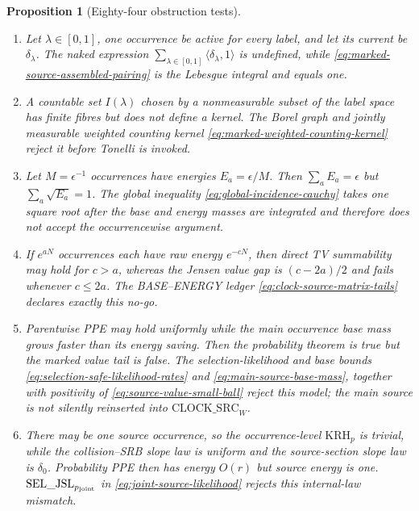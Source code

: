 \documentclass[11pt]{article}
\newtheorem{proposition}[theorem]{Proposition}
\begin{document}
\begin{proposition}[Eighty-four obstruction tests]
\begin{enumerate}[label=\textup{(T\arabic*)}]
      from a probability first-hit partition.  The canonical owner map in
      Definition~\ref{def:source-incidence-space} identifies physical
      occurrences, not event supports, and therefore retains both.
\item Let $\lambda\in[0,1]$, one occurrence be active for every label, and
      let its current be $\delta_\lambda$.  The naked expression
      $\sum_{\lambda\in[0,1]}\langle\delta_\lambda,1\rangle$ is undefined,
      while \eqref{eq:marked-source-assembled-pairing} is the Lebesgue
      integral and equals one.
\item A countable set $I(\lambda)$ chosen by a nonmeasurable subset of the
      label space has finite fibres but does not define a kernel.  The Borel
      graph and jointly measurable weighted counting kernel
      \eqref{eq:marked-weighted-counting-kernel} reject it before Tonelli is
      invoked.
\item Let $M=\epsilon^{-1}$ occurrences have energies
      $E_a=\epsilon/M$.  Then $\sum_aE_a=\epsilon$ but
      $\sum_a\sqrt{E_a}=1$.  The global inequality
      \eqref{eq:global-incidence-cauchy} takes one square root after the base
      and energy masses are integrated and therefore does not accept the
      occurrencewise argument.
\item If $e^{aN}$ occurrences each have raw energy $e^{-cN}$, then direct TV
      summability may hold for $c>a$, whereas the Jensen value gap is
      $(c-2a)/2$ and fails whenever $c\le2a$.  The BASE--ENERGY ledger
      \eqref{eq:clock-source-matrix-tails} declares exactly this no-go.
\item Parentwise PPE may hold uniformly while the main occurrence base mass
      grows faster than its energy saving.  Then the probability theorem is
      true but the marked value tail is false.  The selection-likelihood and
      base bounds \eqref{eq:selection-safe-likelihood-rates} and
      \eqref{eq:main-source-base-mass}, together with positivity of
      \eqref{eq:source-value-small-ball} reject this model; the main source
      is not silently reinserted into $\mathrm{CLOCK\_SRC}_{W}$.
\item There may be one source occurrence, so the occurrence-level
      $\mathrm{KRH}_p$ is trivial, while the collision--SRB slope law is
      uniform and the source-section slope law is $\delta_0$.  Probability
      PPE then has energy $O(r)$ but source energy is one.
      $\mathrm{SEL\_JSL}_{p_{\rm joint}}$ in
      \eqref{eq:joint-source-likelihood} rejects this internal-law mismatch.

\end{enumerate}
\end{proposition}
\end{document}
